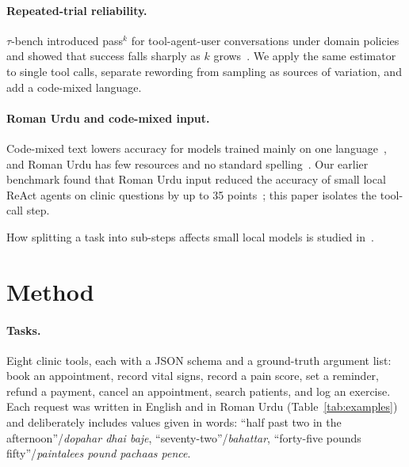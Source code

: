 \documentclass[11pt,a4paper]{article}
\newcommand{\passk}[1]{pass$^{#1}$}
\begin{document}
\paragraph{Repeated-trial reliability.} $\tau$-bench introduced \passk{k} for tool-agent-user conversations under domain
policies and showed that success falls sharply as $k$ grows~\cite{yao2024tau}. We apply the same estimator to single
tool calls, separate rewording from sampling as sources of variation, and add a code-mixed language.

\paragraph{Roman Urdu and code-mixed input.} Code-mixed text lowers accuracy for models trained mainly on one
language~\cite{khanuja2020gluecos}, and Roman Urdu has few resources and no standard spelling~\cite{butt2025romanir,butt2025transliteration}.
Our earlier benchmark found that Roman Urdu input reduced the accuracy of small local ReAct agents on clinic questions by
up to 35 points~\cite{hussain2026romanurdu}; this paper isolates the tool-call step.

How splitting a task into sub-steps affects small local models is studied in~\cite{hussain2026splitting}.

\section{Method}

\paragraph{Tasks.} Eight clinic tools, each with a JSON schema and a ground-truth argument list: book an
appointment, record vital signs, record a pain score, set a reminder, refund a payment, cancel an appointment,
search patients, and log an exercise. Each request was written in English and in Roman Urdu (Table~\ref{tab:examples})
and deliberately includes values given in words: ``half past two in the afternoon''/\emph{dopahar dhai baje},
``seventy-two''/\emph{bahattar}, ``forty-five pounds fifty''/\emph{paintalees pound pachaas pence}.
\end{document}
